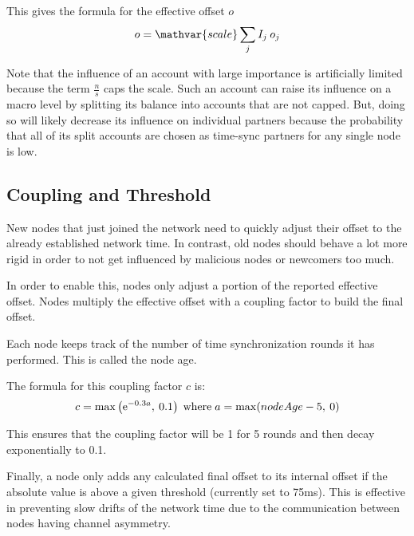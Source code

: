 This gives the formula for the effective offset $o$
$$ o = \mathvar{scale} \sum_j I_j \: o_j$$

Note that the influence of an account with large importance is artificially limited because the term $\frac{n}{s} $ caps the scale.
Such an account can raise its influence on a macro level by splitting its balance into accounts that are not capped.
But, doing so will likely decrease its influence on individual partners because the probability that all of its split accounts are chosen as time-sync partners for any single node is low.

\subsection{Coupling and Threshold}

New nodes that just joined the network need to quickly adjust their offset to the already established network time.
In contrast, old nodes should behave a lot more rigid in order to not get influenced by malicious nodes or newcomers too much.

In order to enable this, nodes only adjust a portion of the reported effective offset.
Nodes multiply the effective offset with a coupling factor to build the final offset.

Each node keeps track of the number of time synchronization rounds it has performed.
This is called the node age.

The formula for this coupling factor $c$ is:
$$c = \max\left(\mathrm{e}^{-0.3a},\: 0.1\right) \; \text{where} \; a = \max(nodeAge - 5,\: 0)$$

This ensures that the coupling factor will be 1 for 5 rounds and then decay exponentially to 0.1.

\begin{figure}
\end{figure}

Finally, a node only adds any calculated final offset to its internal offset if the absolute value is above a given threshold (currently set to 75ms).
This is effective in preventing slow drifts of the network time due to the communication between nodes having channel asymmetry.
